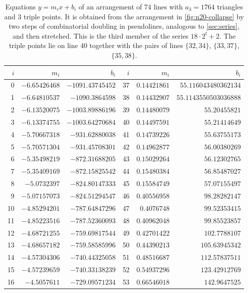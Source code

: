 \begin{table}[p]
\centering
\small
\caption{Equations $y=m_ix+b_i$ of an arrangement of 74 lines with $a_3=1764$ triangles and 3 triple points. It is obtained from the arrangement in \cref{fig:n20-collapse} by two steps of combinatorial doubling in pseudolines, analogous to \cref{sec:series}, and then stretched. This is the third member of the series $18\cdot2^t+2$. The triple points lie on line 40 together with the pairs of lines $\{32,34\}$, $\{33,37\}$, $\{35,38\}$.}
\label{tab:n74-lines}
\begin{tabular}{rrr@{\quad}rrr}
\toprule
$i$ & $m_i$ & $b_i$ & $i$ & $m_i$ & $b_i$ \\
\midrule
0 & $-6.65426468$ & $-1091.43745452$ & 37 & $0.14421861$ & $55.116043480362134$ \\
1 & $-6.64810537$ & $-1090.3864598$ & 38 & $0.14432907$ & $55.1143550503036888$ \\
2 & $-6.13520075$ & $-1003.89886196$ & 39 & $0.14480079$ & $55.20455821$ \\
3 & $-6.13374755$ & $-1003.64270684$ & 40 & $0.14497591$ & $55.21414649$ \\
4 & $-5.70667318$ & $-931.62880038$ & 41 & $0.14739226$ & $55.63755173$ \\
5 & $-5.70571304$ & $-931.45708301$ & 42 & $0.14962877$ & $56.00380269$ \\
6 & $-5.35498219$ & $-872.31688205$ & 43 & $0.15029264$ & $56.12302765$ \\
7 & $-5.35409169$ & $-872.15825542$ & 44 & $0.15480384$ & $56.85487027$ \\
8 & $-5.0732397$ & $-824.80147333$ & 45 & $0.15584749$ & $57.07155497$ \\
9 & $-5.07157073$ & $-824.51294547$ & 46 & $0.40556958$ & $98.28282147$ \\
10 & $-4.85294201$ & $-787.64847296$ & 47 & $0.4076748$ & $99.52353415$ \\
11 & $-4.85223516$ & $-787.52360093$ & 48 & $0.40962048$ & $99.85523857$ \\
12 & $-4.68721255$ & $-759.69817544$ & 49 & $0.42701422$ & $102.7788107$ \\
13 & $-4.68657182$ & $-759.58585996$ & 50 & $0.44390213$ & $105.63945342$ \\
14 & $-4.57304306$ & $-740.44325058$ & 51 & $0.48516687$ & $112.57837511$ \\
15 & $-4.57239659$ & $-740.33138239$ & 52 & $0.54937296$ & $123.42912769$ \\
16 & $-4.5057611$ & $-729.09571234$ & 53 & $0.66546018$ & $142.9647525$ \\

\end{tabular}
\end{table}
